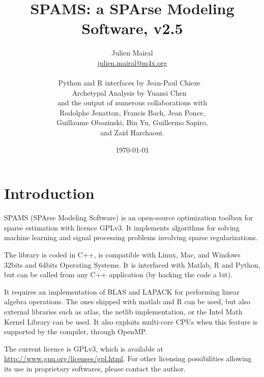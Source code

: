 \documentclass[a4paper, 11pt]{article}
\title{SPAMS: a SPArse Modeling Software, v2.5}
\date{\today}
\author{Julien Mairal \\
   \url{julien.mairal@m4x.org} \\
   ~\\
   Python and R interfaces by Jean-Paul Chieze
   ~\\
   Archetypal Analysis by Yuansi Chen
   ~\\
   and the output of numerous collaborations with \\
   Rodolphe Jenatton, Francis Bach, Jean Ponce, \\ Guillaume Obozinski, Bin Yu, Guillermo Sapiro, \\ and Zaid
Harchaoui.  }
\begin{document}
\maketitle

\tableofcontents

\section{Introduction}
SPAMS (SPArse Modeling Software) is an open-source optimization toolbox for
sparse estimation with licence GPLv3.  It implements algorithms for solving
machine learning and signal processing problems involving sparse
regularizations.

The library is coded in C++, is compatible with Linux, Mac, and Windows 32bits
and 64bits Operating Systems. It is interfaced with Matlab, R and Python, but
can be called from any C++ application (by hacking the code a bit).

It requires an implementation of BLAS and LAPACK for performing linear algebra
operations. The ones shipped with matlab and R can be used, but also external
libraries such as atlas, the netlib implementation, or the Intel Math Kernel
Library can be used.  It also exploits multi-core CPUs when this feature is
supported by the compiler, through OpenMP.

The current licence is GPLv3, which is available at
\url{http://www.gnu.org/licenses/gpl.html}.  For other licensing possibilities
allowing its use in proprietary softwares, please contact the author.
\end{document}
